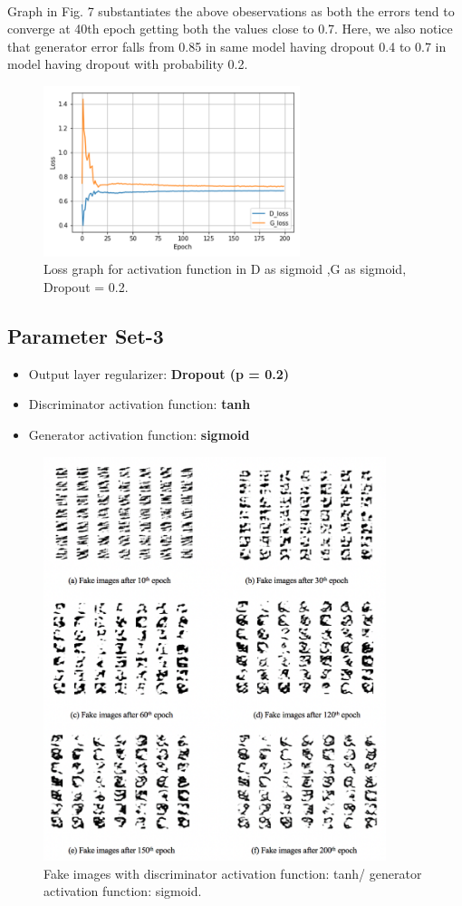 \documentclass{article}
\begin{document}
\paragraph{}
Graph in Fig. 7 substantiates the above obeservations as both the errors tend to converge at 40th epoch getting both the values close to 0.7. Here, we also notice that generator error falls from 0.85 in same model having dropout 0.4 to 0.7 in model having dropout with probability 0.2.


\begin{figure}[H]
	\centering
	\includegraphics[width=7.5cm]{figs/Picture7}
	\caption{Loss graph for activation function in D as sigmoid ,G as sigmoid, Dropout = 0.2.}
\end{figure}



\subsection{Parameter Set-3}
\begin{itemize}
	\item Output layer regularizer: \textbf{Dropout (p = 0.2)}
	\item Discriminator activation function:  \textbf{tanh}
	\item Generator activation function:  \textbf{sigmoid}
\end{itemize}

\begin{figure}[H]
	\centering
	\includegraphics[width=10cm]{figs/Picture8}
	\caption{Fake images with discriminator activation function: tanh/ generator activation function: sigmoid.}
\end{figure}
\end{document}
